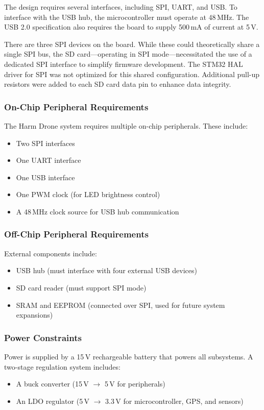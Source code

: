 \documentclass[12pt]{article}
\begin{document}
The design requires several interfaces, including SPI, UART, and USB. To interface with the USB hub, the microcontroller must operate at 48\,MHz. The USB 2.0 specification also requires the board to supply 500\,mA of current at 5\,V.

There are three SPI devices on the board. While these could theoretically share a single SPI bus, the SD card—operating in SPI mode—necessitated the use of a dedicated SPI interface to simplify firmware development. The STM32 HAL driver for SPI was not optimized for this shared configuration. Additional pull-up resistors were added to each SD card data pin to enhance data integrity.

\subsubsection{On-Chip Peripheral Requirements}

The Harm Drone system requires multiple on-chip peripherals. These include:
\begin{itemize}
    \item Two SPI interfaces
    \item One UART interface
    \item One USB interface
    \item One PWM clock (for LED brightness control)
    \item A 48\,MHz clock source for USB hub communication
\end{itemize}

\subsubsection{Off-Chip Peripheral Requirements}

External components include:
\begin{itemize}
    \item USB hub (must interface with four external USB devices)
    \item SD card reader (must support SPI mode)
    \item SRAM and EEPROM (connected over SPI, used for future system expansions)
\end{itemize}

\subsubsection{Power Constraints}

Power is supplied by a 15\,V rechargeable battery that powers all subsystems. A two-stage regulation system includes:
\begin{itemize}
    \item A buck converter (15\,V $\rightarrow$ 5\,V for peripherals)
    \item An LDO regulator (5\,V $\rightarrow$ 3.3\,V for microcontroller, GPS, and sensors)
\end{itemize}
\end{document}
